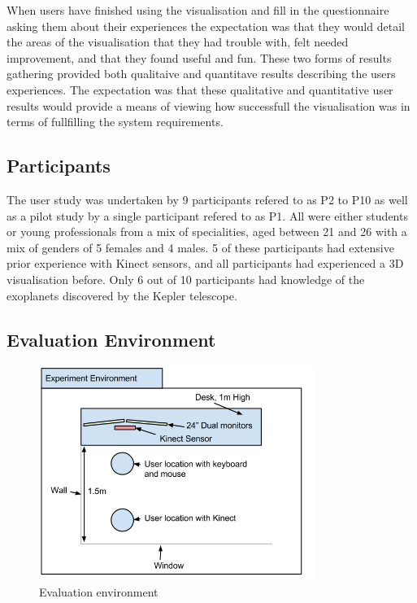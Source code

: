When users have finished using the visualisation and fill in the questionnaire
asking them about their experiences the expectation was that
they would detail the areas of the visualisation that they had trouble with,
felt needed improvement, and that they found useful and fun. These two forms of
results gathering provided both qualitaive and quantitave results describing the
users experiences.
The expectation was that these qualitative and quantitative user results would
provide a means of viewing how successfull the visualisation was in terms of
fullfilling the system requirements.

\subsection{Participants}
The user study was undertaken by 9 participants refered to as P2 to P10 as well
as 
a pilot study by a single participant refered to as P1. All were either students
or
young professionals from a mix of specialities, aged between 21 and 26 with a
mix
of genders of 5 females and 4 males. 5 of these participants had extensive
prior experience with Kinect sensors, and all participants had experienced a 3D
visualisation before. Only 6 out of 10 participants had knowledge of the
exoplanets discovered by the Kepler telescope.

\subsection{Evaluation Environment}
\begin{figure}[H]
  \centering
      \includegraphics[width=0.8\textwidth]{images/environment.png}
  \caption{Evaluation environment}  
    \label{fig:environment}
\end{figure}


